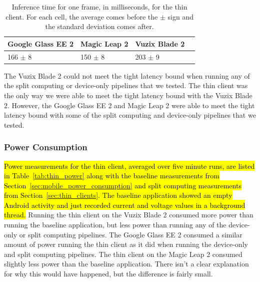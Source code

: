 \begin{table}
\begin{tabular}{|l||l|l|l|}
  \hline
  Google Glass EE 2 & Magic Leap 2 & Vuzix Blade 2\\
  \hline
  \hline
  166 $\pm$ 8 & 150 $\pm$ 8 & 203 $\pm$ 9\\
  \hline
\end{tabular}
  \caption{
    Inference time for one frame, in milliseconds, for the thin client.
    For each cell, the average comes before the $\pm$ sign and the standard
    deviation comes after.
  }\label{tab:thin_times}
\end{table}

The Vuzix Blade 2 could not meet the tight latency bound when running any of the
split computing or device-only pipelines that we tested.
The thin client was the only way we were able to meet the tight latency bound
with the Vuzix Blade 2.
However, the Google Glass EE 2 and Magic Leap 2 were able to meet the tight
latency bound with some of the split computing and device-only pipelines that we
tested.

\subsubsection{Power Consumption}

\hl{
Power measurements for the thin client, averaged over five minute runs, are
listed in Table~{\ref{tab:thin_power}} along with the baseline measurements from
Section~{\ref{sec:mobile_power_consumption}}
and split computing measurements from Section~{\ref{sec:thin_clients}}.
The baseline application showed an empty Android activity and just recorded
current and voltage values in a background thread.
}
Running the thin client on the Vuzix Blade 2 consumed more power than running
the baseline application, but less power than running any of the device-only or
split computing pipelines.
The Google Glass EE 2 consumed a similar amount of power running the thin client
as it did when running the device-only and split computing pipelines.
The thin client on the Magic Leap 2 consumed slightly less power than the
baseline application.
There isn't a clear explanation for why this would have happened, but the
difference is fairly small.

